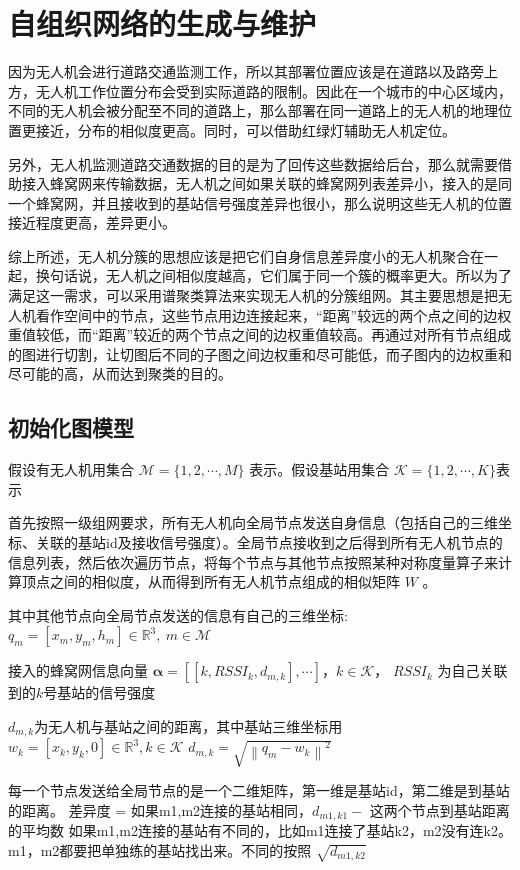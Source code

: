 \documentclass{article}
\begin{document}
\section{自组织网络的生成与维护}
因为无人机会进行道路交通监测工作，所以其部署位置应该是在道路以及路旁上方，无人机工作位置分布会受到实际道路的限制。因此在一个城市的中心区域内，不同的无人机会被分配至不同的道路上，那么部署在同一道路上的无人机的地理位置更接近，分布的相似度更高。同时，可以借助红绿灯辅助无人机定位。\

另外，无人机监测道路交通数据的目的是为了回传这些数据给后台，那么就需要借助接入蜂窝网来传输数据，无人机之间如果关联的蜂窝网列表差异小，接入的是同一个蜂窝网，并且接收到的基站信号强度差异也很小，那么说明这些无人机的位置接近程度更高，差异更小。\

综上所述，无人机分簇的思想应该是把它们自身信息差异度小的无人机聚合在一起，换句话说，无人机之间相似度越高，它们属于同一个簇的概率更大。所以为了满足这一需求，可以采用谱聚类算法来实现无人机的分簇组网。其主要思想是把无人机看作空间中的节点，这些节点用边连接起来，“距离”较远的两个点之间的边权重值较低，而“距离”较近的两个节点之间的边权重值较高。再通过对所有节点组成的图进行切割，让切图后不同的子图之间边权重和尽可能低，而子图内的边权重和尽可能的高，从而达到聚类的目的。
\subsection{初始化图模型}
假设有无人机用集合 $\mathcal{M} = \{1,2,\cdots,M\} $ 表示。假设基站用集合 $ \mathcal{K} = \{1,2,\cdots, K \} $表示


首先按照一级组网要求，所有无人机向全局节点发送自身信息（包括自己的三维坐标、关联的基站id及接收信号强度）。全局节点接收到之后得到所有无人机节点的信息列表，然后依次遍历节点，将每个节点与其他节点按照某种对称度量算子来计算顶点之间的相似度，从而得到所有无人机节点组成的相似矩阵 $W$ 。


其中其他节点向全局节点发送的信息有自己的三维坐标:
$q_{m} = [x_{m}, y_{m}, h_{m}] \in \mathbb{R}^{3}, \ m \in \mathcal{M} $\

接入的蜂窝网信息向量
$ \boldsymbol{\alpha} = [[k, RSSI_{k},d_{m,k}], \cdots] $，$k \in \mathcal{K}$， $RSSI_{k}$ 为自己关联到的$k$号基站的信号强度\

$d_{m, k}$为无人机与基站之间的距离，其中基站三维坐标用 $w_{k} = [x_{k}, y_{k}, 0] \in \mathbb{R}^3, k \in \mathcal{K} $
$d_{m,k} = \sqrt{\left\|q_{m}-w_{k}\right\|^{2}}$

每一个节点发送给全局节点的是一个二维矩阵，第一维是基站id，第二维是到基站的距离。
差异度 = 
	如果m1,m2连接的基站相同，$d_{m1,k1} - $ 这两个节点到基站距离的平均数
      如果m1,m2连接的基站有不同的，比如m1连接了基站k2，m2没有连k2。m1，m2都要把单独练的基站找出来。不同的按照 $\sqrt{d_{m1,k2}}$
\end{document}
